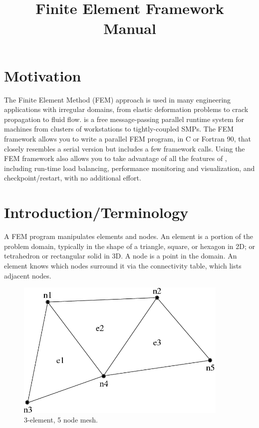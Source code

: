 \documentclass[10pt]{article}
\title{\charmpp\\ Finite Element Framework\\ Manual}
\begin{document}
\maketitle

\section{Motivation}

The Finite Element Method (FEM) approach is used in many engineering
applications with irregular domains, from elastic deformation problems to
crack propagation to fluid flow.  \charmpp{} is a free message-passing parallel
runtime system for machines from clusters of workstations to tightly-coupled
SMPs.  The \charmpp{} FEM framework allows you to write a parallel FEM program,
in C or Fortran 90, that closely resembles a serial version but includes
a few framework calls.
Using the FEM framework also allows you to take advantage of all the
features of \charmpp, including run-time load balancing,  performance
monitoring and visualization, and checkpoint/restart, with no additional
effort.


\section{Introduction/Terminology}

A FEM program manipulates elements and nodes. An element is a portion of
the problem domain, typically in the shape of a triangle, square, or hexagon
in 2D; or tetrahedron or rectangular solid in 3D.  A node is a point in the
domain.  An element knows which nodes surround it via the connectivity
table, which lists adjacent nodes.

\begin{figure}[h]
\begin{center}
\includegraphics[width=4in]{simple_mesh}
\end{center}
\caption{3-element, 5 node mesh.}
\label{fig:simplemesh}
\end{figure}
\end{document}
